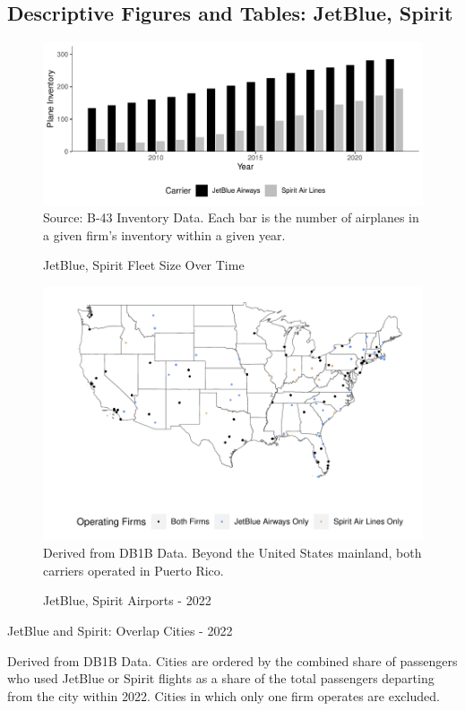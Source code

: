 \documentclass{article}
\begin{document}
\begin{appendices}
    \FloatBarrier\pagebreak

	\subsection{Descriptive Figures and Tables: JetBlue, Spirit}
	\begin{figure}[h]
	\caption{JetBlue, Spirit Fleet Size Over Time}
	\label{fig:Both_fleet}
	\includegraphics[width = \linewidth]{Both_Planes.pdf}
	\footnotesize{Source: B-43 Inventory Data. Each bar is the number of airplanes in a given firm's inventory within a given year.}
\end{figure}

\begin{figure}
	\caption{JetBlue, Spirit Airports - 2022}
	\label{fig:JBSpirit_Airports_2022}
	\includegraphics[width = \linewidth]{Map_Mainland_Both_2022.pdf}
	\footnotesize{Derived from DB1B Data. Beyond the United States mainland, both carriers operated in Puerto Rico.}
\end{figure}


	\begin{table}
		\caption{JetBlue and Spirit: Overlap Cities - 2022}
		\label{tab:KeyCities}
		
		\footnotesize{Derived from DB1B Data. Cities are ordered by the combined share of passengers who used JetBlue or Spirit flights as a share of the total passengers departing from the city within 2022. Cities in which only one firm operates are excluded.}
	\end{table}


\end{appendices}
\end{document}

